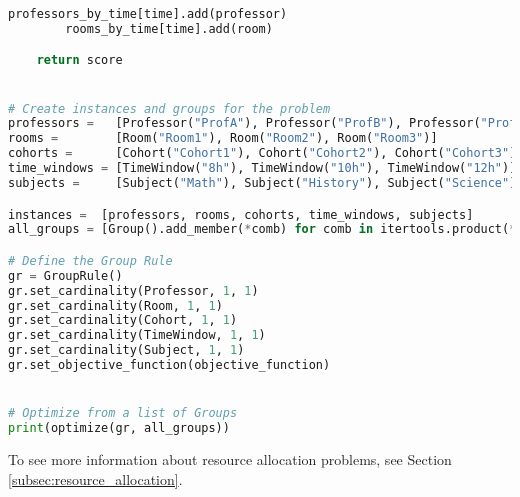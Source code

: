 \begin{lstlisting}[language=Python, caption={Creating and solving the Timetable Scheduling Problem using this framework.}, label={script:time_table}]
        professors_by_time[time].add(professor)
        rooms_by_time[time].add(room)

    return score


# Create instances and groups for the problem
professors =   [Professor("ProfA"), Professor("ProfB"), Professor("ProfC")]
rooms =        [Room("Room1"), Room("Room2"), Room("Room3")]
cohorts =      [Cohort("Cohort1"), Cohort("Cohort2"), Cohort("Cohort3")]
time_windows = [TimeWindow("8h"), TimeWindow("10h"), TimeWindow("12h")]
subjects =     [Subject("Math"), Subject("History"), Subject("Science")]

instances =  [professors, rooms, cohorts, time_windows, subjects]
all_groups = [Group().add_member(*comb) for comb in itertools.product(*instances)]

# Define the Group Rule
gr = GroupRule()
gr.set_cardinality(Professor, 1, 1)
gr.set_cardinality(Room, 1, 1)
gr.set_cardinality(Cohort, 1, 1)
gr.set_cardinality(TimeWindow, 1, 1)
gr.set_cardinality(Subject, 1, 1)
gr.set_objective_function(objective_function)


# Optimize from a list of Groups
print(optimize(gr, all_groups))
\end{lstlisting}

To see more information about resource allocation problems, see Section \ref{subsec:resource_allocation}.